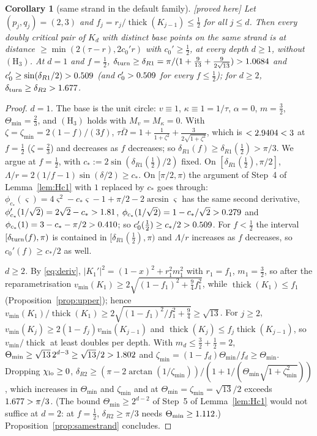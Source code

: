 \documentclass[10pt,a4paper]{article}
\theoremstyle{plain}
\newtheorem{corollary}[theorem]{Corollary}
\theoremstyle{definition}
\theoremstyle{remark}
\newcommand{\thick}{\operatorname{thick}}
\newcommand{\status}[1]{\textsf{\small [#1]}}
\begin{document}
\begin{corollary}[same strand in the default family]\label{cor:samefamily}\status{proved here}
Let $(p_j,q_j)=(2,3)$ and $f_j=r_j/\thick(K_{j-1})\le\frac12$ for all $j\le d$. Then every doubly critical pair of $K_d$ with distinct base points on the same strand is at distance $\ge\min(2(\tau-r),2c_0'r)$ with $c_0'\ge\frac12$, at every depth $d\ge1$, without $(\mathrm H_3)$. At $d=1$ and $f=\frac12$, $\delta_{\rm turn}\ge\delta_{R1}=\pi/(1+\frac9{13}+\frac9{2\sqrt{13}})>1.0684$ and $c_0'\ge\sin(\delta_{R1}/2)>0.509$ (and $c_0'>0.509$ for every $f\le\frac12$); for $d\ge2$, $\delta_{\rm turn}\ge\delta_{R2}>1.677$.
\end{corollary}
\begin{proof}
\emph{$d=1$.} The base is the unit circle: $v\equiv1$, $\kappa\equiv1=1/\tau$, $\alpha=0$, $m=\frac32$, $\Theta_{\min}=\frac23$, and $(\mathrm H_3)$ holds with $M_v=M_\kappa=0$. With $\zeta=\zeta_{\min}=2(1-f)/(3f)$, $\tau\bar\Omega=1+\frac1{1+\zeta^2}+\frac{3}{2\sqrt{1+\zeta^2}}$, which is $<2.9404<3$ at $f=\frac12$ ($\zeta=\frac23$) and decreases as $f$ decreases; so $\delta_{R1}(f)\ge\delta_{R1}(\frac12)>\pi/3$. We argue at $f=\frac12$, with $c_\ast:=2\sin(\delta_{R1}(\frac12)/2)$ fixed. On $[\delta_{R1}(\frac12),\pi/2]$, $\Lambda/r=2(1/f-1)\sin(\delta/2)\ge c_\ast$. On $[\pi/2,\pi)$ the argument of Step~4 of Lemma~\ref{lem:Hc1} with $1$ replaced by $c_\ast$ goes through: $\phi_{c_\ast}(\varsigma)=4\varsigma^2-c_\ast\varsigma-1+\pi/2-2\arcsin\varsigma$ has the same second derivative, $\phi_{c_\ast}'(1/\sqrt2)=2\sqrt2-c_\ast>1.81$, $\phi_{c_\ast}(1/\sqrt2)=1-c_\ast/\sqrt2>0.279$ and $\phi_{c_\ast}(1)=3-c_\ast-\pi/2>0.410$; so $c_0'(\frac12)\ge c_\ast/2>0.509$. For $f<\frac12$ the interval $[\delta_{\rm turn}(f),\pi)$ is contained in $[\delta_{R1}(\frac12),\pi)$ and $\Lambda/r$ increases as $f$ decreases, so $c_0'(f)\ge c_\ast/2$ as well.

\emph{$d\ge2$.} By \eqref{eq:deriv}, $|K_1'|^2=(1-x)^2+r_1^2m_1^2$ with $r_1=f_1$, $m_1=\frac32$, so after the reparametrisation $v_{\min}(K_1)\ge2\sqrt{(1-f_1)^2+\frac94f_1^2}$, while $\thick(K_1)\le f_1$ (Proposition~\ref{prop:upper}); hence $v_{\min}(K_1)/\thick(K_1)\ge2\sqrt{(1-f_1)^2/f_1^2+\frac94}\ge\sqrt{13}$. For $j\ge2$, $v_{\min}(K_j)\ge2(1-f_j)v_{\min}(K_{j-1})$ and $\thick(K_j)\le f_j\thick(K_{j-1})$, so $v_{\min}/\thick$ at least doubles per depth. With $m_d\le\frac32+\frac12=2$, $\Theta_{\min}\ge\sqrt{13}\,2^{d-3}\ge\sqrt{13}/2>1.802$ and $\zeta_{\min}=(1-f_d)\Theta_{\min}/f_d\ge\Theta_{\min}$. Dropping $\chi_{\rm lo}\ge0$, $\delta_{R2}\ge(\pi-2\arctan(1/\zeta_{\min}))/(1+1/(\Theta_{\min}\sqrt{1+\zeta_{\min}^2}))$, which increases in $\Theta_{\min}$ and $\zeta_{\min}$ and at $\Theta_{\min}=\zeta_{\min}=\sqrt{13}/2$ exceeds $1.677>\pi/3$. (The bound $\Theta_{\min}\ge2^{d-2}$ of Step~5 of Lemma~\ref{lem:Hc1} would not suffice at $d=2$: at $f=\frac12$, $\delta_{R2}\ge\pi/3$ needs $\Theta_{\min}\ge1.112$.) Proposition~\ref{prop:samestrand} concludes.
\end{proof}
\end{document}
